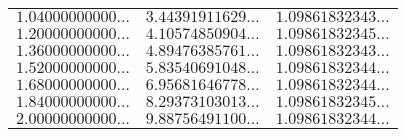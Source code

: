 \begin{table}
\begin{center}
\begin{tabular}{|c|c|c|}
$1.04000000000\ldots$ & $3.44391911629\ldots$ & $1.09861832343\ldots$ \\ 
$1.20000000000\ldots$ & $4.10574850904\ldots$ & $1.09861832345\ldots$ \\ 
$1.36000000000\ldots$ & $4.89476385761\ldots$ & $1.09861832343\ldots$ \\ 
$1.52000000000\ldots$ & $5.83540691048\ldots$ & $1.09861832344\ldots$ \\ 
$1.68000000000\ldots$ & $6.95681646778\ldots$ & $1.09861832344\ldots$ \\ 
$1.84000000000\ldots$ & $8.29373103013\ldots$ & $1.09861832345\ldots$ \\ 
$2.00000000000\ldots$ & $9.88756491100\ldots$ & $1.09861832344\ldots$ \\ 
\cline{1-3}
\end{tabular}
\end{center}
\end{table}
